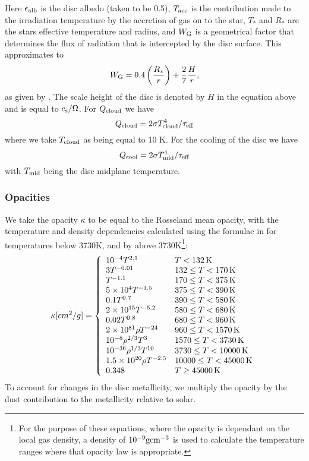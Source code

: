 \documentclass[a4paper,fleqn,usenatbib]{mnras}
\begin{document}
Here $\epsilon_{\rm alb}$ is the disc albedo (taken to be 0.5), $T_{\rm acc}$ is the contribution made to the irradiation temperature by the accretion of gas on to the star, $T_*$ and $R_*$ are the stars effective temperature and radius, and $W_{\rm G}$ is a geometrical factor that determines the flux of radiation that is intercepted by the disc surface.
This approximates to
\begin{equation}
W_{\rm G} = 0.4 \left(\frac{R_*}{r}\right) +\frac{2}{7}\frac{H}{r},
\end{equation}
as given by \citet{Dangelo12}.
The scale height of the disc is denoted by $H$ in the equation above and is equal to $c_{\rm s}/\Omega$.
For $Q_{\rm cloud}$ we have
\begin{equation}
Q_{\rm cloud} = 2\sigma T_{\rm cloud}^4/\tau_{\rm eff}
\end{equation}
where we take $T_{\rm cloud}$ as being equal to 10 K.
For the cooling of the disc we have
\begin{equation}
Q_{\rm cool} = 2\sigma T_{\rm mid}^4/\tau_{\rm eff}
\end{equation}
with $T_{\rm mid}$ being the disc midplane temperature.

\subsubsection{Opacities}
We take the opacity $\kappa$ to be equal to the Rosseland mean opacity, with the temperature and density dependencies calculated using the formulae in \citet{Bell97} for temperatures below 3730K, and by \citet{Bell94} above 3730K\footnote{For the purpose of these equations, where the opacity is dependant on the local gas density, a density of $10^{-9} \rm gcm^{-3}$ is used to calculate the temperature ranges where that opacity law is appropriate.}:
\begin{equation}
\kappa[cm^2/g] = \left\{ \begin{array}{ll}
10^{-4}T^{2.1} & T<132 \, {\rm K} \\
3T^{-0.01} & 132\le T<170 \, {\rm K} \\
T^{-1.1} & 170\le T<375 \, {\rm K} \\
5\times 10^{4}T^{-1.5} & 375\le T<390 \, {\rm K} \\
0.1T^{0.7} & 390\le T<580 \, {\rm K} \\
2\times 10^{15}T^{-5.2} & 580\le T<680 \, {\rm K} \\
0.02T^{0.8} & 680\le T<960 \, {\rm K} \\
2\times 10^{81}\rho T^{-24} & 960\le T<1570 \, {\rm K} \\
10^{-8}\rho^{2/3}T^{3} & 1570\le T<3730 \, {\rm K} \\
10^{-36}\rho^{1/3}T^{10} & 3730\le T<10000 \, {\rm K} \\
1.5\times 10^{20}\rho T^{-2.5} & 10000\le T<45000 \, {\rm K} \\
0.348 & T \ge 45000 \, {\rm K}
\end{array}\right.
\end{equation}
To account for changes in the disc metallicity, we multiply the opacity by the dust contribution to the metallicity relative to solar.
\end{document}

